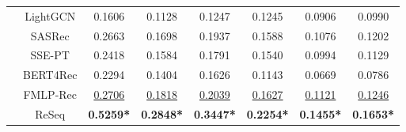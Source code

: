 \begin{table}[]
{{\begin{tabular}{@{}cccccccc@{}}
 & LightGCN & 0.1606 & 0.1128 & 0.1247 & 0.1245 & 0.0906 & 0.0990 \\ \cmidrule(l){2-8}
  & SASRec   & 0.2663 & 0.1698 & 0.1937 & 0.1588 & 0.1076 & 0.1202 \\
  & SSE-PT   & 0.2418	& 0.1584	& 0.1791	& 0.1540	& 0.0994	& 0.1129 \\
 & BERT4Rec & 0.2294 & 0.1404 & 0.1626 & 0.1143 & 0.0669 & 0.0786 \\
                               & FMLP-Rec     & \underline{0.2706}    & \underline{0.1818}    & \underline{0.2039}    & \underline{0.1627}    & \underline{0.1121}    & \underline{0.1246}    \\ \cmidrule(l){2-8}
                               & ReSeq        & \textbf{0.5259*} & \textbf{0.2848*} & \textbf{0.3447*} & \textbf{0.2254*} & \textbf{0.1455*} & \textbf{0.1653*} \\
                               \bottomrule
\end{tabular}}}
\end{table}

